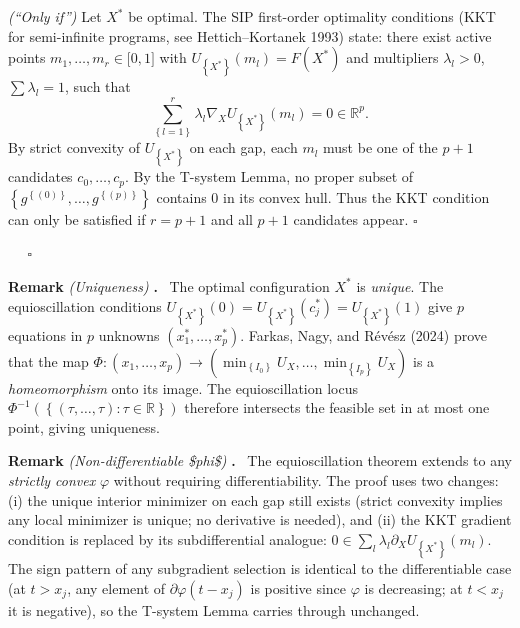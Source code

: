 \documentclass[
]{article}
\begin{document}
\emph{(``Only if'')} Let \(X^{*}\) be optimal. The SIP first-order
optimality conditions (KKT for semi-infinite programs, see
Hettich--Kortanek 1993) state: there exist active points
\(m_{1},\ldots,m_{r} \in \lbrack 0,1\rbrack\) with
\(U_{\left\{ X^{*} \right\}}\left( m_{l} \right) = F\left( X^{*} \right)\)
and multipliers \(\lambda_{l} > 0\), \(\sum\lambda_{l} = 1\), such that
\[\sum_{\left\{ l = 1 \right\}}^{r}\lambda_{l}\nabla_{X}U_{\left\{ X^{*} \right\}}\left( m_{l} \right) = 0 \in {\mathbb{R}}^{p}.\]
By strict convexity of \(U_{\left\{ X^{*} \right\}}\) on each gap, each
\(m_{l}\) must be one of the \(p + 1\) candidates
\(c_{0},\ldots,c_{p}\). By the T-system Lemma, no proper subset of
\(\left\{ g^{\left\{ (0) \right\}},\ldots,g^{\left\{ (p) \right\}} \right\}\)
contains \(0\) in its convex hull. Thus the KKT condition can only be
satisfied if \(r = p + 1\) and all \(p + 1\) candidates appear.
\(\square\)

   \(\square\)

\textbf{Remark} \emph{(Uniqueness)} \textbf{.}  The optimal
configuration \(X^{*}\) is \emph{unique}. The equioscillation conditions
\(U_{\left\{ X^{*} \right\}}(0) = U_{\left\{ X^{*} \right\}}\left( c_{j}^{*} \right) = U_{\left\{ X^{*} \right\}}(1)\)
give \(p\) equations in \(p\) unknowns
\(\left( x_{1}^{*},\ldots,x_{p}^{*} \right)\). Farkas, Nagy, and Révész
(2024) prove that the map
\(\Phi:\left( x_{1},\ldots,x_{p} \right) \rightarrow \left( \min_{\left\{ I_{0} \right\}}U_{X},\ldots,\min_{\left\{ I_{p} \right\}}U_{X} \right)\)
is a \emph{homeomorphism} onto its image. The equioscillation locus
\(\Phi^{- 1}\left( \left\{ (\tau,\ldots,\tau):\tau \in {\mathbb{R}} \right\} \right)\)
therefore intersects the feasible set in at most one point, giving
uniqueness.

\textbf{Remark} \emph{(Non-differentiable \$phi\$)} \textbf{.}  The
equioscillation theorem extends to any \emph{strictly convex}
\(\varphi\) without requiring differentiability. The proof uses two
changes: (i) the unique interior minimizer on each gap still exists
(strict convexity implies any local minimizer is unique; no derivative
is needed), and (ii) the KKT gradient condition is replaced by its
subdifferential analogue:
\(0 \in \sum_{l}\lambda_{l}\partial_{X}U_{\left\{ X^{*} \right\}}\left( m_{l} \right)\).
The sign pattern of any subgradient selection is identical to the
differentiable case (at \(t > x_{j}\), any element of
\(\partial\varphi(t - x_{j})\) is positive since \(\varphi\) is
decreasing; at \(t < x_{j}\) it is negative), so the T-system Lemma
carries through unchanged.
\end{document}
